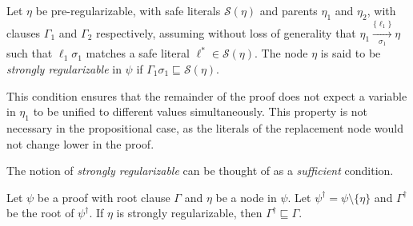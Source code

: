 \begin{definition} %
\label{prop:extracheck}
Let $\eta$ be pre-regularizable, with safe literals $\mathcal{S}(\eta)$ and parents $\eta_1$ and $\eta_2$, with clauses $\Gamma_1$ and $\Gamma_2$ respectively, assuming without loss of generality that $\eta_1 \xrightarrow[\sigma_1]{\{\ell_1\} } \eta$
such that $\ell_1\sigma_1$ matches a safe literal $\ell^*\in \mathcal{S}(\eta)$. 
The node $\eta$ is said to be \emph{strongly regularizable} in $\psi$ if $\Gamma_1 \sigma_{1} \sqsubseteq \mathcal{S}(\eta)$.
\end{definition}

This condition ensures that the remainder of the proof does not expect a variable in $\eta_1$ to be unified to different values simultaneously. This property is not necessary in the propositional case, as the literals of the replacement node would not change lower in the proof. 



The notion of \emph{strongly regularizable} can be thought of as a \emph{sufficient} condition. 



\begin{theorem}\label{thm:correct}
Let $\psi$ be a proof with root clause $\Gamma$ and $\eta$ be a node in $\psi$. Let $\psi^{\dagger} = \psi\setminus \{\eta\}$ and $\Gamma^{\dagger}$ be the root of $\psi^{\dagger}$. If $\eta$ is strongly regularizable, then $\Gamma^{\dagger} \sqsubseteq \Gamma$.
\end{theorem}

